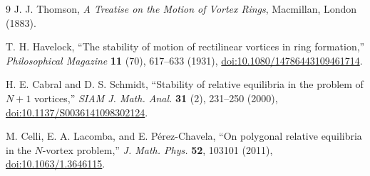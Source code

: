 \documentclass[10pt]{article}
\begin{document}
\begin{thebibliography}{9}
J. J. Thomson, \emph{A Treatise on the Motion of Vortex Rings}, Macmillan,
London (1883).

T. H. Havelock, ``The stability of motion of rectilinear vortices in ring
formation,'' \emph{Philosophical Magazine} \textbf{11} (70), 617--633 (1931),
\href{https://doi.org/10.1080/14786443109461714}{doi:10.1080/14786443109461714}.

H. E. Cabral and D. S. Schmidt, ``Stability of relative equilibria in the
problem of $N+1$ vortices,'' \emph{SIAM J. Math. Anal.} \textbf{31} (2),
231--250 (2000),
\href{https://doi.org/10.1137/S0036141098302124}{doi:10.1137/S0036141098302124}.

M. Celli, E. A. Lacomba, and E. P\'erez-Chavela, ``On polygonal relative
equilibria in the $N$-vortex problem,'' \emph{J. Math. Phys.} \textbf{52},
103101 (2011),
\href{https://doi.org/10.1063/1.3646115}{doi:10.1063/1.3646115}.
\end{thebibliography}
\end{document}
